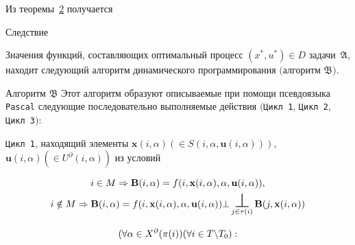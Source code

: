\smallskip



Из теоремы~\hyperlink{ovch:th2}{2} получается



\smallskip



\begin{newthm}{Следствие}

Значения функций, составляющих оптимальный процесс \linebreak $(x^\ast,u^\ast)\in D$ задачи~\hyperlink{ovch:zadmm}{$\mathfrak{A}$}, находит следующий алгоритм динамического программирования $($алгоритм \hyperlink{ovch:alg}{$\mathfrak{B}$}$).$

\end{newthm}



\smallskip



\hypertarget{ovch:alg}{}



\begin{newthm}{Алгоритм $\mathfrak{B}$} Этот алгоритм образуют описываемые при помощи псевдоязыка \verb"Pascal" {\rm \cite{ovchinnikov:bib4}} следующие последовательно выполняемые действия \linebreak \rm $(${\tt Цикл~1}, {\tt Цикл 2}, {\tt Цикл 3}$)$:

\end{newthm}



\smallskip



\hypertarget{ovch:loop1}{}



{\tt Цикл 1}, находящий элементы ${\mathbf x}(i,\alpha )(\in S(i,\alpha

,{\mathbf u}(i,\alpha)))$, ${\mathbf u}(i,\alpha )(\in U^\partial

(i,\alpha ))$ из условий

\begin{gather*}

i\in M\Rightarrow {\bf B}(i,\alpha )=f(i,{\mathbf x}(i,\alpha

),\alpha

,{\mathbf u}(i,\alpha)),\\

i\notin M\Rightarrow {\bf B}(i,\alpha )=f(i,{\mathbf x}(i,\alpha

),\alpha ,{\mathbf u}(i,\alpha ))\bot \mathop{\text{\huge$\perp$}}\limits_{j\in

\tau (i)}

{\bf B}(j,{\mathbf x}(i,\alpha ))\\

(\forall \alpha \in X^\partial (\pi (i))

(\forall i\in T\backslash T_0 ):

\end{gather*}



